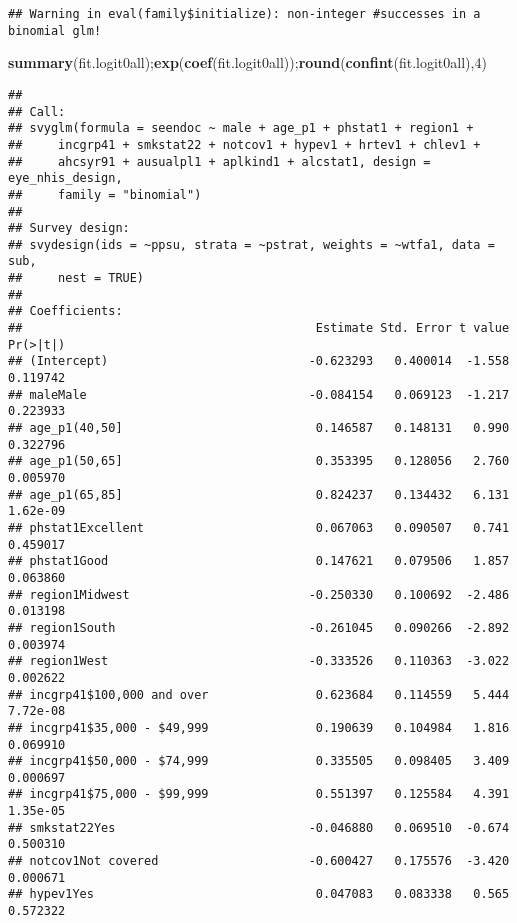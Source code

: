 \documentclass[]{article}
\newenvironment{Shaded}{\begin{snugshade}}{\end{snugshade}}
\newcommand{\DecValTok}[1]{\textcolor[rgb]{0.00,0.00,0.81}{#1}}
\newcommand{\KeywordTok}[1]{\textcolor[rgb]{0.13,0.29,0.53}{\textbf{#1}}}
\newcommand{\NormalTok}[1]{#1}
\begin{document}
\begin{verbatim}
## Warning in eval(family$initialize): non-integer #successes in a binomial glm!
\end{verbatim}

\begin{Shaded}
\begin{Highlighting}[]
\KeywordTok{summary}\NormalTok{(fit.logit0all);}\KeywordTok{exp}\NormalTok{(}\KeywordTok{coef}\NormalTok{(fit.logit0all));}\KeywordTok{round}\NormalTok{(}\KeywordTok{confint}\NormalTok{(fit.logit0all),}\DecValTok{4}\NormalTok{)}
\end{Highlighting}
\end{Shaded}

\begin{verbatim}
## 
## Call:
## svyglm(formula = seendoc ~ male + age_p1 + phstat1 + region1 + 
##     incgrp41 + smkstat22 + notcov1 + hypev1 + hrtev1 + chlev1 + 
##     ahcsyr91 + ausualpl1 + aplkind1 + alcstat1, design = eye_nhis_design, 
##     family = "binomial")
## 
## Survey design:
## svydesign(ids = ~ppsu, strata = ~pstrat, weights = ~wtfa1, data = sub, 
##     nest = TRUE)
## 
## Coefficients:
##                                         Estimate Std. Error t value Pr(>|t|)
## (Intercept)                            -0.623293   0.400014  -1.558 0.119742
## maleMale                               -0.084154   0.069123  -1.217 0.223933
## age_p1(40,50]                           0.146587   0.148131   0.990 0.322796
## age_p1(50,65]                           0.353395   0.128056   2.760 0.005970
## age_p1(65,85]                           0.824237   0.134432   6.131 1.62e-09
## phstat1Excellent                        0.067063   0.090507   0.741 0.459017
## phstat1Good                             0.147621   0.079506   1.857 0.063860
## region1Midwest                         -0.250330   0.100692  -2.486 0.013198
## region1South                           -0.261045   0.090266  -2.892 0.003974
## region1West                            -0.333526   0.110363  -3.022 0.002622
## incgrp41$100,000 and over               0.623684   0.114559   5.444 7.72e-08
## incgrp41$35,000 - $49,999               0.190639   0.104984   1.816 0.069910
## incgrp41$50,000 - $74,999               0.335505   0.098405   3.409 0.000697
## incgrp41$75,000 - $99,999               0.551397   0.125584   4.391 1.35e-05
## smkstat22Yes                           -0.046880   0.069510  -0.674 0.500310
## notcov1Not covered                     -0.600427   0.175576  -3.420 0.000671
## hypev1Yes                               0.047083   0.083338   0.565 0.572322

\end{verbatim}
\end{document}
